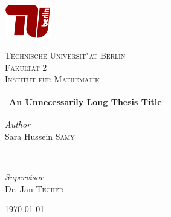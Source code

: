 \documentclass[12pt,a4paper]{article}
\theoremstyle{definition}
\theoremstyle{remark}
\theoremstyle{definition}
\begin{document}
\color{RichBlack}


\begin{titlepage}
\newcommand{\HRule}{\rule{\linewidth}{0.5mm}}
\begin{center}

\includegraphics[width=0.15\textwidth]{TU-Berlin-Logo.png}\\[1cm]
\begin{otherlanguage}{german}
\textsc{\LARGE Technische Universit"at Berlin}\\[1.5cm]
\textsc{\large Fakult\"at 2}\\[0.5cm]
\textsc{\large Institut f\"ur Mathematik}\\[0.5cm]
\end{otherlanguage}

\setlength{\aboverulesep}{10pt}
\setlength{\belowrulesep}{13pt}
\begin{tabularx}{\textwidth}{ >{\centering\arraybackslash}X}
\midrule[0.5mm]
\huge\bfseries An Unnecessarily Long Thesis Title\\
\midrule[0.5mm]
\end{tabularx}

\begin{minipage}{0.4\textwidth}
    \begin{flushleft}
        \large
        \textit{\textcolor{TUColor}{Author}}\\
        Sara Hussein \textsc{Samy}
    \end{flushleft}
\end{minipage}
~
\begin{minipage}{0.4\textwidth}
    \begin{flushright}
        \large
        \textit{\textcolor{TUColor}{Supervisor}}\\
        Dr. Jan \textsc{Techer}
    \end{flushright}
\end{minipage}

\vspace{260 pt}
{\large\today}
\end{center}
\end{titlepage}
\end{document}

